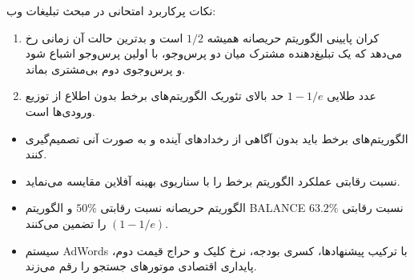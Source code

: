 \begin{examnote}
نکات پرکاربرد امتحانی در مبحث تبلیغات وب:
\begin{enumerate}
    \item کران پایینی الگوریتم حریصانه همیشه $1/2$ است و بدترین حالت آن زمانی رخ می‌دهد که یک تبلیغ‌دهنده مشترک میان دو پرس‌وجو، با اولین پرس‌وجو اشباع شود و پرس‌وجوی دوم بی‌مشتری بماند.
    \item عدد طلایی $1 - 1/e$ حد بالای تئوریک الگوریتم‌های برخط بدون اطلاع از توزیع ورودی‌ها است.
\end{enumerate}
\end{examnote}

\begin{summarybox}
\begin{itemize}
    \item الگوریتم‌های برخط باید بدون آگاهی از رخدادهای آینده و به صورت آنی تصمیم‌گیری کنند.
    \item نسبت رقابتی عملکرد الگوریتم برخط را با سناریوی بهینه آفلاین مقایسه می‌نماید.
    \item الگوریتم حریصانه نسبت رقابتی $50\%$ و الگوریتم BALANCE نسبت رقابتی $63.2\%$ $(1-1/e)$ را تضمین می‌کنند.
    \item سیستم AdWords با ترکیب پیشنهادها، کسری بودجه، نرخ کلیک و حراج قیمت دوم، پایداری اقتصادی موتورهای جستجو را رقم می‌زند.
\end{itemize}
\end{summarybox}

